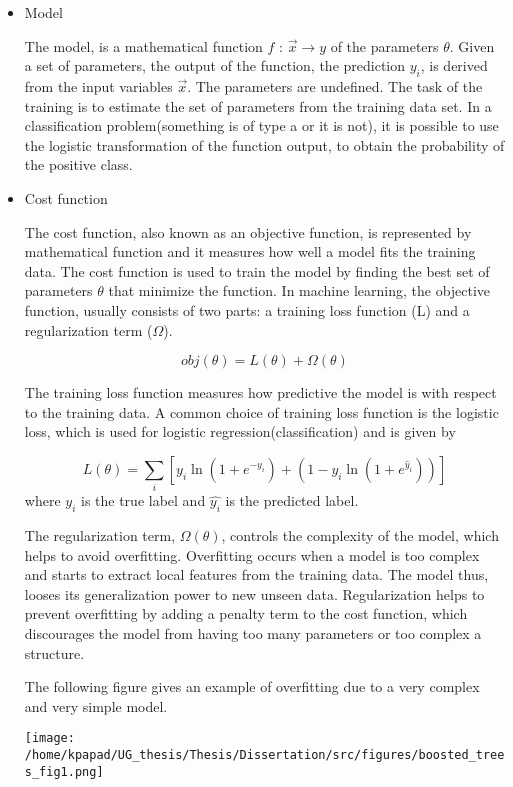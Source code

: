 \begin{itemize}
\item Model
\label{sec:org31e7a41}

The model, is a mathematical function \(f\text{ : } \vec{x} \rightarrow y\) of the parameters \(\theta\). Given a set of parameters, the output of the function, the prediction \(y_{i}\), is derived from the input variables \(\vec{x}\).
The parameters are undefined. The task of the training is to estimate the set of parameters from the training data set.
In a classification problem(something is of type a or it is not), it is possible to use the logistic transformation of the function output, to obtain the probability of the positive class.

\item Cost function
\label{sec:orgac31e22}

The cost function, also known as an objective function, is represented by mathematical function and it measures how well a model fits the training data. The cost function is used to train the model by finding the best set of parameters \(\theta\) that minimize the function.
In machine learning, the objective function, usually consists of two parts: a training loss function (L) and a regularization term (\(\Omega\)).

\[
obj(\theta) = L(\theta) + \Omega(\theta)
\]

The training loss function measures how predictive the model is with respect to the training data. A common choice of training loss function is the logistic loss, which is used for logistic regression(classification) and is given by

\[
L(\theta) = \sum_{i}[ y_{i}\ln(1+e^{-\hat{y_{i}}})+(1-y_{i}\ln(1+e^{\hat{y}_{i}}))]
\]
where \(y_{i}\) is the true label and \(\hat{y_{i}}\) is the predicted label.

The regularization term, \(\Omega(\theta)\), controls the complexity of the model, which helps to avoid overfitting. Overfitting occurs when a model is too complex and starts to extract local features from the training data. The model thus, looses its generalization power to new unseen data. Regularization helps to prevent overfitting by adding a penalty term to the cost function, which discourages the model from having too many parameters or too complex a structure.

The following figure gives an example of overfitting due to a very complex and very simple model.
\begin{center}
\texttt{[image: /home/kpapad/UG\_thesis/Thesis/Dissertation/src/figures/boosted\_trees\_fig1.png]}
\end{center}
\end{itemize}

